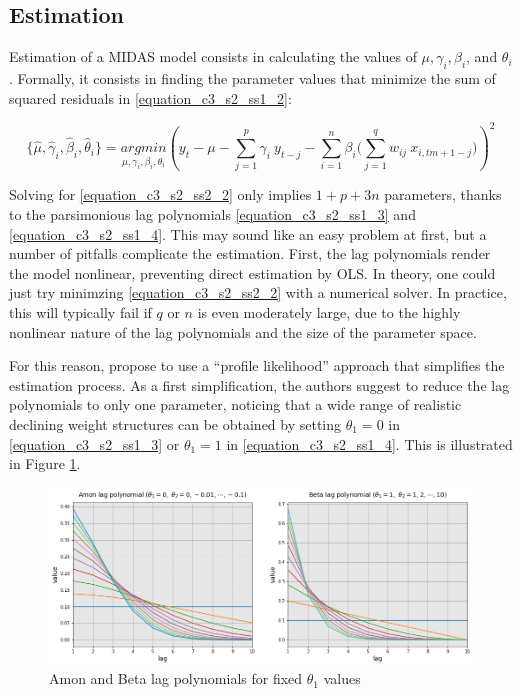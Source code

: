 \subsection{Estimation}
\label{chapter3_section2_subsection2}


Estimation of a MIDAS model consists in calculating the values of $\mu, \gamma_i, \beta_i$, and $\theta_i$. Formally, it consists in finding the parameter values that minimize the sum of squared residuals in \ref{equation_c3_s2_ss1_2}:

\begin{equation}
\{ \hat{\mu}, \hat{\gamma}_i, \hat{\beta}_i, \hat{\theta}_i\} = \underset{\mu, \gamma_i, \beta_i, \theta_i}{argmin} 
\left( y_t - \mu - \sum_{j=1}^{p} \gamma_i \ y_{t-j} - \sum_{i=1}^{n} \beta_i \big( \sum_{j=1}^{q}  w_{ij} \  x_{i,tm+1-j} \big) \right)^2
\label{equation_c3_s2_ss2_2}
\end{equation}

\newpage

Solving for \ref{equation_c3_s2_ss2_2} only implies $1+p+3n$ parameters, thanks to the parsimonious lag polynomials \ref{equation_c3_s2_ss1_3} and \ref{equation_c3_s2_ss1_4}. This may sound like an easy problem at first, but a number of pitfalls complicate the estimation. First, the lag polynomials render the model nonlinear, preventing direct estimation by OLS. In theory, one could just try minimzing \ref{equation_c3_s2_ss2_2} with a numerical solver. In practice, this will typically fail if $q$ or $n$ is even moderately large, due to the highly nonlinear nature of the lag polynomials and the size of the parameter space.

For this reason, \cite{Ghysels2016b} propose to use a ``profile likelihood'' approach that simplifies the estimation process. As a first simplification, the authors suggest to reduce the lag polynomials to only one parameter, noticing that a wide range of realistic declining weight structures can be obtained by setting $\theta_1 = 0$ in \ref{equation_c3_s2_ss1_3} or $\theta_1 = 1$ in \ref{equation_c3_s2_ss1_4}. This is illustrated in Figure \ref{fig_c3_s2_ss2_1}.

\begin{figure}[H]
\centering
\includegraphics[scale=0.47]{images/lag_polynomials.png}
\caption{Amon and Beta lag polynomials for fixed $\theta_1$ values}
\label{fig_c3_s2_ss2_1}
\end{figure}

